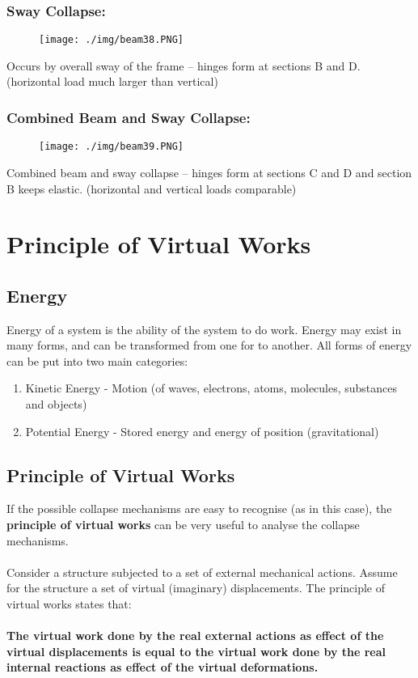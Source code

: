 \subsubsection{Sway Collapse:}
\begin{figure}[H]
  \centering
  \texttt{[image: ./img/beam38.PNG]}
\end{figure}
Occurs by overall sway of the frame – hinges form at sections B and D. (horizontal load much larger than vertical)
\subsubsection{Combined Beam and Sway Collapse:}
\begin{figure}[H]
  \centering
  \texttt{[image: ./img/beam39.PNG]}
\end{figure}
Combined beam and sway collapse – hinges form at sections C and D and section B keeps elastic. (horizontal and vertical loads comparable)
\section{Principle of Virtual Works}
\subsection{Energy}
Energy of a system is the ability of the system to do work. Energy may exist in many forms, and can be transformed from one for to another. All forms of energy can be put into two main categories:
\begin{enumerate}
  \item Kinetic Energy - Motion (of waves, electrons, atoms, molecules, substances and objects)
  \item Potential Energy - Stored energy and energy of position (gravitational)
\end{enumerate}
\subsection{Principle of Virtual Works}
If the possible collapse mechanisms are easy to recognise (as in this case), the \textbf{principle of virtual works} can be very useful to analyse the collapse mechanisms. \\\\
Consider a structure subjected to a set of external mechanical actions. Assume for the structure a set of virtual (imaginary) displacements. The principle of virtual works states that: \\\\
\textbf{The virtual work done by the real external actions as effect of the virtual displacements is equal to the virtual work done by the real internal reactions as effect of the virtual deformations.}
